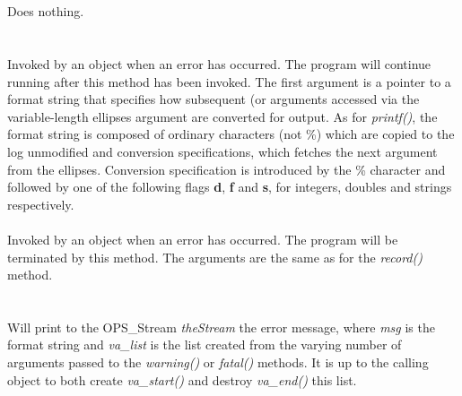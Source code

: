  \\
\\ 
Does nothing. \\

  \\
\\
Invoked by an object when an error has occurred. The program will
continue running after this method has been invoked. The first
argument is a pointer to a format string that specifies how
subsequent (or arguments accessed via the variable-length ellipses
argument are converted for output. As for {\em printf()}, the format
string is composed of ordinary characters (not \%) which are copied to
the log unmodified and conversion specifications, which fetches the
next argument from the ellipses. Conversion specification is
introduced by the \% character and followed by one of the following
flags {\bf d}, {\bf f} and {\bf s}, for integers, doubles and strings
respectively. \\


\\ 
Invoked by an object when an error has occurred. The program will be
terminated by this method. The arguments are the same as for the {\em
record()} method.\\ 

  \\
\\ 
Will print to the OPS_Stream {\em theStream} the error message, where
{\em msg} is the format string  and {\em va\_list} is the list created
from the varying number of arguments passed to the {\em warning()} or
{\em fatal()} methods. It is up to the calling object to both create
{\em va\_start()} and destroy {\em va\_end()} this list. 

